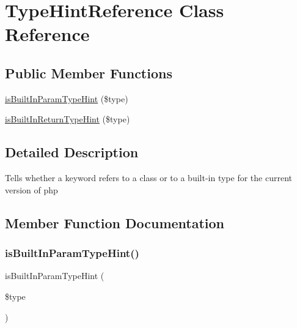 \hypertarget{class_prophecy_1_1_doubler_1_1_generator_1_1_type_hint_reference}{}\section{Type\+Hint\+Reference Class Reference}
\label{class_prophecy_1_1_doubler_1_1_generator_1_1_type_hint_reference}
\subsection*{Public Member Functions}
\begin{DoxyCompactItemize}
\item 
\mbox{\hyperlink{class_prophecy_1_1_doubler_1_1_generator_1_1_type_hint_reference_a068564f754ac680bf4b57abd1253d584}{is\+Built\+In\+Param\+Type\+Hint}} (\$type)
\item 
\mbox{\hyperlink{class_prophecy_1_1_doubler_1_1_generator_1_1_type_hint_reference_a960caa6842a728dad06ca34a3f925272}{is\+Built\+In\+Return\+Type\+Hint}} (\$type)
\end{DoxyCompactItemize}


\subsection{Detailed Description}
Tells whether a keyword refers to a class or to a built-\/in type for the current version of php 

\subsection{Member Function Documentation}
\mbox{\label{class_prophecy_1_1_doubler_1_1_generator_1_1_type_hint_reference_a068564f754ac680bf4b57abd1253d584}} 
\subsubsection{\texorpdfstring{is\+Built\+In\+Param\+Type\+Hint()}{isBuiltInParamTypeHint()}}
{\footnotesize\ttfamily is\+Built\+In\+Param\+Type\+Hint (\begin{DoxyParamCaption}\item[{}]{\$type }\end{DoxyParamCaption})}

